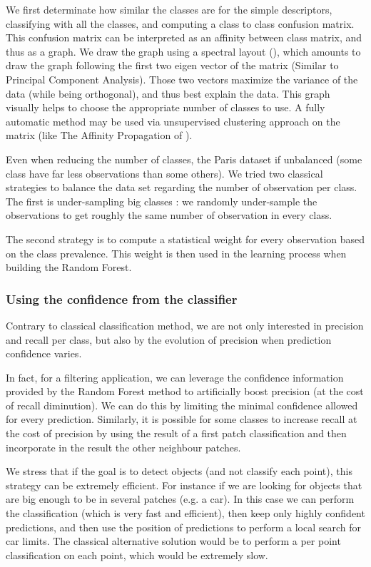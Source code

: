 		\label{lod.method.classification.spectral_layout}
		We first determinate how similar the classes are for the simple descriptors, classifying with all the classes, and computing a class to class confusion matrix.
		This confusion matrix can be interpreted as an affinity between class matrix, and thus as a graph.
		We draw the graph using a spectral layout (\cite{Networkx2014}),
		 which amounts to draw the graph following the first two eigen vector of the matrix (Similar to Principal Component Analysis).
		Those two vectors maximize the variance of the data (while being orthogonal), and thus best explain the data.
		This graph visually helps to choose the appropriate number of classes to use.
		A fully automatic method may be used via unsupervised clustering approach on the matrix 
		(like The Affinity Propagation of \cite{Frey2007}).
		
		Even when reducing the number of classes, the Paris dataset if unbalanced (some class have far less observations than some others).
		We tried two classical strategies to balance the data set regarding the number of observation per class.
		The first is under-sampling big classes : we randomly under-sample the observations to get roughly the same number of observation in every class.
		
		The second strategy is to compute a statistical weight for every observation based on the class prevalence. 
		This weight is then used in the learning process when building the Random Forest.
		
		\subsubsection{Using the confidence from the classifier} 
		\label{lod.method.classification.using_confidence}
		Contrary to classical classification method, we are not only interested in precision and recall per class, but also by the evolution of precision when prediction confidence varies.
		
		In fact, for a filtering application, we can leverage the confidence information provided by the Random Forest method to artificially boost precision (at the cost of recall diminution). We can do this by limiting the minimal confidence allowed for every prediction.
		Similarly, it is possible for some classes to increase recall at the cost of precision by using the result of a first patch classification and then incorporate in the result the other neighbour patches. 
		
		We stress that if the goal is to detect objects (and not classify each point), this strategy can be extremely efficient.
		For instance if we are looking for objects that are big enough to be in several patches (e.g. a car).
		In this case we can perform the classification (which is very fast and efficient), then keep only highly confident predictions, and then use the position of predictions to perform a local search for car limits.
		The classical alternative solution would be to perform a per point classification on each point, which would be extremely slow.
		 